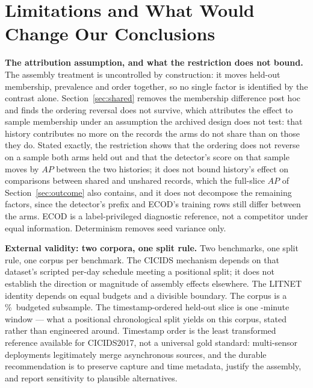 \documentclass[manuscript,screen,nonacm]{acmart}
\begin{document}
\section{Limitations and What Would Change Our Conclusions}
\label{sec:threats}

\textbf{The attribution assumption, and what the restriction does not
bound.} The assembly treatment is uncontrolled by construction: it moves
held-out membership, prevalence and order together, so no single factor is
identified by the contrast alone. Section~\ref{sec:shared} removes the
membership difference post hoc and finds the ordering reversal does not
survive, which attributes the effect to sample membership under an assumption
the archived design does not test: that history contributes no more on the
records the arms do not share than on those they do. Stated exactly, the
restriction shows that the ordering does not reverse on a sample both arms
held out and that the detector's score on that sample moves by
\RevSharedDetectorSpread{} $AP$ between the two histories; it does not bound
history's effect on comparisons between shared and unshared records, which the
full-slice $AP$ of Section~\ref{sec:outcome} also contains, and it does not
decompose the remaining factors, since the detector's prefix and ECOD's
training rows still differ between the arms. ECOD is a label-privileged
diagnostic reference, not a competitor under equal information. Determinism
removes seed variance only.

\textbf{External validity: two corpora, one split rule.}
Two benchmarks, one split rule, one corpus per benchmark.
The CICIDS mechanism depends on that dataset's scripted per-day schedule
meeting a positional split; it does not establish the direction or magnitude of
assembly effects elsewhere. The LITNET identity depends on equal budgets and a
divisible boundary. The corpus is a \CicidsWeekRetentionPct\%\ budgeted
subsample. The timestamp-ordered held-out slice is one
\CicidsNaturalHeldoutSpanMinutes-minute window --- what a positional
chronological split yields on this corpus, stated rather than engineered
around. Timestamp order is the least transformed reference available for
CICIDS2017, not a universal gold standard: multi-sensor deployments
legitimately merge asynchronous sources, and the durable recommendation is to
preserve capture and time metadata, justify the assembly, and report sensitivity
to plausible alternatives.
\end{document}
